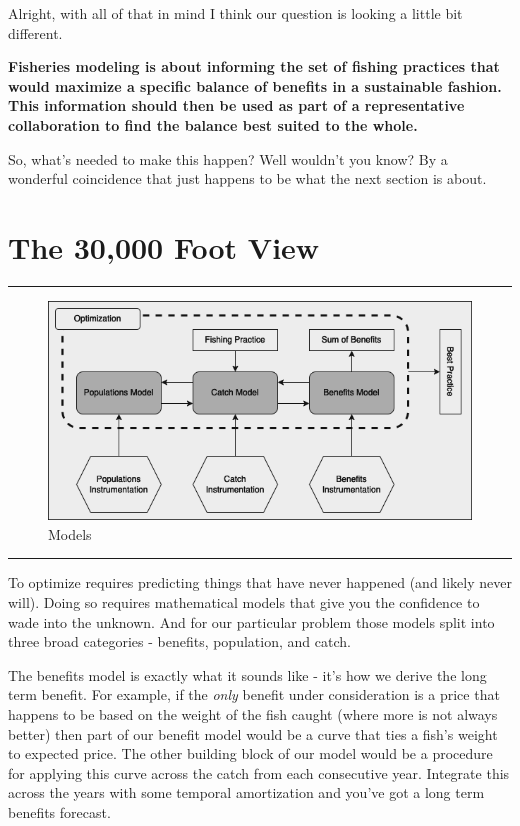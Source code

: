 \documentclass[11pt,a5paper]{book}
\begin{document}
Alright, with all of that in mind I think our question is looking a little bit different. 
\newline

 \hangindent=1cm \noindent \textbf{Fisheries modeling is about informing the set of fishing practices that would maximize a specific balance of benefits in a sustainable fashion. This information should then be used as part of a representative collaboration to find the balance best suited to the whole.}
\newline

So, what's needed to make this happen? Well wouldn't you know? By a wonderful coincidence that just happens to be what the next section is about. 
\newpage

\chapter{The 30,000 Foot View}

\noindent \rule{\textwidth}{0.5pt} 
\begin{figure}[h!] 
  \includegraphics[width=\linewidth]{drawings/high_level_models.png}
  \caption{Models}
  \label{fig:high_level_models}
\end{figure}
\newline
\rule{\textwidth}{0.5pt} 
\vspace{5pt}

To optimize requires predicting things that have never happened (and likely never will). Doing so requires mathematical models that give you the confidence to wade into the unknown. And for our particular problem those models split into three broad categories - benefits, population, and catch. 
\newline

The benefits model is exactly what it sounds like - it's how we derive the long term benefit. For example, if the \textit{only} benefit under consideration is a price that happens to be based on the weight of the fish caught (where more is not always better) then part of our benefit model would be a curve that ties a fish's weight to expected price. The other building block of our model would be a procedure for applying this curve across the catch from each consecutive year. Integrate this across the years with some temporal amortization and you've got a long term benefits forecast. 
\newline
\end{document}
